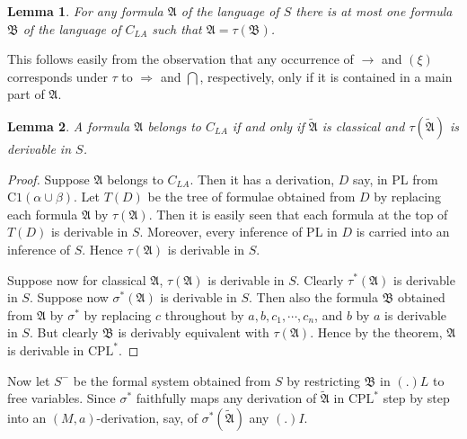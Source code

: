 \documentclass[12pt,a4paper]{article}
\newtheorem{lemma}{Lemma}
\begin{document}
\begin{lemma}
For any formula $\mathfrak{A}$ of the language of $S$ there is at most one
formula $\mathfrak{B}$ of the language of $C_{LA}$ such that $\mathfrak{A} = \tau(\mathfrak{B})$.
\end{lemma}

This follows easily from the observation that any occurrence of $\to$ and
$(\xi)$ corresponds under $\tau$ to $\Rightarrow$ and $\bigcap$, respectively,
only if it is contained in a main part of $\mathfrak{A}$.

\begin{lemma}
A formula $\mathfrak{A}$ belongs to $C_{LA}$ if and only if $\tilde{\mathfrak{A}}$
is classical and $\tau(\tilde{\mathfrak{A}})$ is derivable in $S$.
\end{lemma}

\begin{proof}
Suppose $\mathfrak{A}$ belongs to $C_{LA}$. Then it has a derivation, $D$
say, in PL from $\mathrm{C1}(\alpha \cup \beta)$. Let $T(D)$ be the tree of
formulae obtained from $D$ by replacing each formula $\mathfrak{A}$ by
$\tau(\mathfrak{A})$. Then it is easily seen that each formula at the top of
$T(D)$ is derivable in $S$. Moreover, every inference of PL in $D$ is carried
into an inference of $S$. Hence $\tau(\mathfrak{A})$ is derivable in $S$.

Suppose now for classical $\mathfrak{A}$, $\tau(\mathfrak{A})$ is derivable
in $S$. Clearly $\tau^*(\mathfrak{A})$ is derivable in $S$. Suppose now
$\sigma^*(\mathfrak{A})$ is derivable in $S$. Then also the formula
$\mathfrak{B}$ obtained from $\mathfrak{A}$ by $\sigma^*$ by replacing
$c$ throughout by $a, b, c_1, \cdots, c_n$, and $b$ by $a$ is derivable in
$S$. But clearly $\mathfrak{B}$ is derivably equivalent with $\tau(\mathfrak{A})$.
Hence by the theorem, $\mathfrak{A}$ is derivable in $\mathrm{CPL}^*$.
\end{proof}

\noindent
Now let $S^-$ be the formal system obtained from $S$ by restricting
$\mathfrak{B}$ in $(.)L$ to free variables. Since $\sigma^*$ faithfully maps
any derivation of $\tilde{\mathfrak{A}}$ in $\mathrm{CPL}^*$ step by step
into an $(M, a)$-derivation, say, of $\sigma^*(\tilde{\mathfrak{A}})$ any
$(.)I$.
\end{document}
